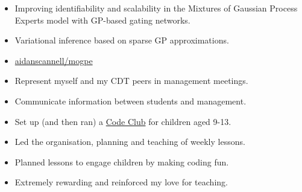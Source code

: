 \documentclass[10pt,a4paper,ragged2e,withhyper]{altacv}
\begin{document}
\begin{paracol}{2}

\begin{itemize}
\item Improving identifiability and scalability in the Mixtures of Gaussian Process Experts model with GP-based gating networks.
\item Variational inference based on sparse GP approximations.
\item \href{https://github.com/aidanscannell/mogpe}{\faGithub aidanscannell/mogpe}
\end{itemize}


\label{sec:orgee03d65}

\begin{itemize}
\item Represent myself and my CDT peers in management meetings.
\item Communicate information between students and management.
\end{itemize}


\par\divider
{}

\begin{itemize}
\item Set up (and then ran) a \href{https://codeclub.org/en/}{Code Club} for children aged 9-13.
\item Led the organisation, planning and teaching of weekly lessons.
\item Planned lessons to engage children by making coding fun.
\item Extremely rewarding and reinforced my love for teaching.
\end{itemize}


\label{sec:orgb9bfa3f}


\end{paracol}
\end{document}
